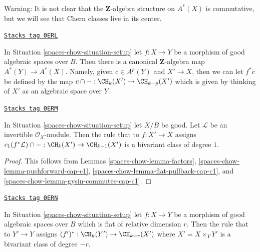 Warning: It is not clear that the $\mathbf{Z}$-algebra structure
on $A^*(X)$ is commutative, but we will see that Chern classes live
in its center.

\begin{remark}
\label{spaces-chow-remark-pullback-cohomology}
\href{https://stacks.math.columbia.edu/tag/0ERL}{\texttt{Stacks tag 0ERL}}

In Situation \ref{spaces-chow-situation-setup} let $f : X \to Y$ be a morphism of
good algebraic spaces over $B$.
Then there is a canonical $\mathbf{Z}$-algebra map $A^*(Y) \to A^*(X)$.
Namely, given $c \in A^p(Y)$ and $X' \to X$, then we can let $f^*c$
be defined by the map $c \cap - : \CH_k(X') \to \CH_{k - p}(X')$ which is
given by thinking of $X'$ as an algebraic space over $Y$.
\end{remark}

\begin{lemma}
\label{spaces-chow-lemma-cap-c1-bivariant}
\href{https://stacks.math.columbia.edu/tag/0ERM}{\texttt{Stacks tag 0ERM}}

In Situation \ref{spaces-chow-situation-setup} let $X/B$ be good.
Let $\mathcal{L}$ be an invertible $\mathcal{O}_X$-module.
Then the rule that to $f : X' \to X$ assigns
$c_1(f^*\mathcal{L}) \cap - : \CH_k(X') \to \CH_{k - 1}(X')$
is a bivariant class of degree $1$.
\end{lemma}

\begin{proof}
This follows from Lemmas \ref{spaces-chow-lemma-factors},
\ref{spaces-chow-lemma-pushforward-cap-c1},
\ref{spaces-chow-lemma-flat-pullback-cap-c1}, and
\ref{spaces-chow-lemma-gysin-commutes-cap-c1}.
\end{proof}

\begin{lemma}
\label{spaces-chow-lemma-flat-pullback-bivariant}
\href{https://stacks.math.columbia.edu/tag/0ERN}{\texttt{Stacks tag 0ERN}}

In Situation \ref{spaces-chow-situation-setup} let $f : X \to Y$ be a morphism
of good algebraic spaces over $B$ which is flat of relative dimension $r$.
Then the rule that to $Y' \to Y$ assigns
$(f')^* : \CH_k(Y') \to \CH_{k + r}(X')$ where $X' = X \times_Y Y'$
is a bivariant class of degree $-r$.
\end{lemma}

